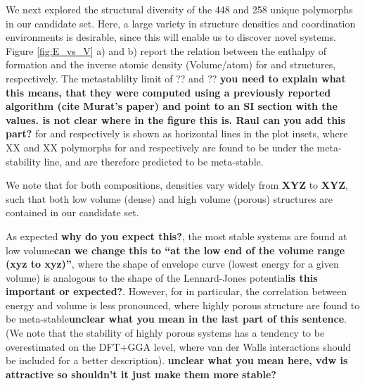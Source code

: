 %
We next explored the structural diversity of the 448 \IrOtwo and 258 \IrOthree unique polymorphs in our candidate set.
Here, a large variety in structure densities and coordination environments is desirable, since this will enable us to discover novel systems.
Figure \ref{fig:E_vs_V} a) and b) report the relation between the enthalpy of formation and the inverse atomic density (Volume/atom) for \IrOtwo and \IrOthree structures, respectively.
The metastablilty limit of ?? and ?? \textbf{you need to explain what this means, that they were computed using a previously reported algorithm (cite Murat's paper) and point to an SI section with the values.  is not clear where in the figure this is. Raul can you add this part?} for \IrOtwo and \IrOthree respectively is shown as horizontal lines in the plot insets, where XX and XX polymorphs for \IrOtwo and \IrOthree respectively are found to be under the meta-stability line, and are therefore predicted to be  meta-stable.

We note that for both compositions, densities vary widely from \textbf{XYZ} to \textbf{XYZ}, such that both low volume (dense) and high volume (porous) structures are contained in our candidate set.

As expected \textbf{why do you expect this?}, the most stable systems are found at low volume\textbf{can we change this to ``at the low end of the volume range (xyz to xyz)''}, where the shape of envelope curve (lowest energy for a given volume) is analogous to the shape of the Lennard-Jones potential\textbf{is this important or expected?}.
However, for \IrOthree in particular, the correlation between energy and volume is less pronounced, where highly porous structure are found to be meta-stable\textbf{unclear what you mean in the last part of this sentence}. (We note that the stability of highly porous systems has a tendency to be overestimated on the DFT+GGA level, where van der Walls interactions should be included for a better description). \textbf{unclear what you mean here, vdw is attractive so shouldn't it just make them more stable?}

